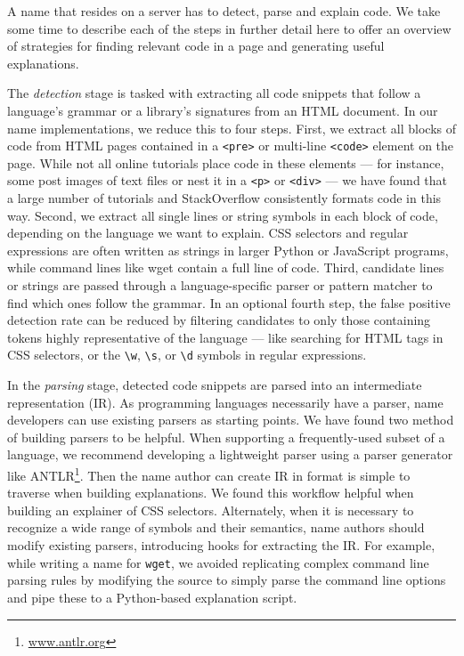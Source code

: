 A \gls{name} that resides on a server has to detect, parse and explain code.
We take some time to describe each of the steps in further detail here to offer an overview of strategies for finding relevant code in a page and generating useful explanations.

The \emph{detection} stage is tasked with extracting all code snippets that follow a language's grammar or a library's signatures from an HTML document.
In our \gls{name} implementations, we reduce this to four steps.
First, we extract all blocks of code from HTML pages contained in a \texttt{<pre>} or multi-line \texttt{<code>} element on the page.
While not all online tutorials place code in these elements --- for instance, some post images of text files or nest it in a \texttt{<p>} or \texttt{<div>} --- we have found that a large number of tutorials and StackOverflow consistently formats code in this way.
Second, we extract all single lines or string symbols in each block of code, depending on the language we want to explain.
CSS selectors and regular expressions are often written as strings in larger Python or JavaScript programs, while command lines like wget contain a full line of code.
Third, candidate lines or strings are passed through a language-specific parser or pattern matcher to find which ones follow the grammar.
In an optional fourth step, the false positive detection rate can be reduced by filtering candidates to only those containing tokens highly representative of the language --- like searching for HTML tags in CSS selectors, or the \texttt{\textbackslash{}w}, \texttt{\textbackslash{}s}, or \texttt{\textbackslash{}d} symbols in regular expressions.

In the \emph{parsing} stage, detected code snippets are parsed into an intermediate representation (IR). 
As programming languages necessarily have a parser, \gls{name} developers can use existing parsers as starting points.
We have found two method of building parsers to be helpful.
When supporting a frequently-used subset of a language, we recommend developing a lightweight parser using a parser generator like ANTLR\footnote{\url{www.antlr.org}}.
Then the \gls{name} author can create IR in format is simple to traverse when building explanations.
We found this workflow helpful when building an explainer of CSS selectors.
Alternately, when it is necessary to recognize a wide range of symbols and their semantics, \gls{name} authors should modify existing parsers, introducing hooks for extracting the IR. 
For example, while writing a \gls{name} for \texttt{wget}, we avoided replicating complex command line parsing rules by modifying the source to simply parse the command line options and pipe these to a Python-based explanation script.

